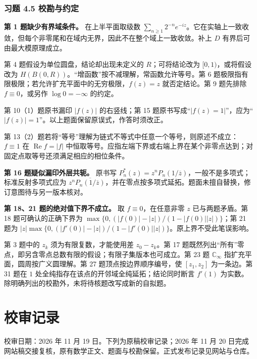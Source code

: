 \documentclass[11pt,a4paper]{article}
\begin{document}
\subsubsection{习题 4.5
校勘与约定}\label{ch04-practice-ux4e60ux9898-45-ux6821ux52d8ux4e0eux7ea6ux5b9a}

\textbf{第 1 题缺少有界域条件。} 在上半平面取级数
\(\sum_{n\ge1}2^{-n}e^{-iz}\)。它在实轴上一致收敛，但每个非零尾和在域内无界，因此不在整个域上一致收敛。补上
\(D\) 有界后可由最大模原理成立。

第 4 题假设为单位圆盘，结论却出现未定义的 \(R\)；可将结论改为
\([0,1)\)，或将假设改为
\(H(B(0,R))\)。``增函数''按不减理解，常函数允许等号。第 6
题极限指有限极限；若允许扩充平面中的无穷极限，\(f(z)=z\) 就否定结论。第
9 题先排除 \(f\equiv0\)，或另作 \(\log0=-\infty\) 的约定。

第 10（1）题原书漏印 \(|f(z)|\) 的右竖线；第 15
题原书写成``\(|f(z)=1|\)''，应为``\(|f(z)|=1\)''。以上题面保留原误式，作答时须改正。

第
13（2）题若将``等号''理解为链式不等式中任意一个等号，则原述不成立：\(f\equiv1\)
在 \(\operatorname{Re}f=|f|\)
中恒取等号。应指左端下界或右端上界在某个非零点达到；对固定点取等号还须满足相应的相位条件。

\textbf{第 16 题疑似漏印外层共轭。} 原书写
\(P_n^*(z)=z^nP_n(1/\overline z)\)，一般不是多项式；标准反射多项式应为
\(z^n\overline{P_n(1/\overline z)}\)，并在零点按多项式延拓。题面未擅自替换，修订意图待与另一版本核对。

\textbf{第 18、21 题的绝对值下界不成立。} 取 \(f\equiv0\)，在任意非零
\(z\) 已与两题矛盾。第 18 题可确认的正确下界为
\(\max\{0,(|f(0)|-|z|)/(1-|f(0)||z|)\}\)；第 21 题为
\(|z|\max\{0,(|f'(0)|-|z|)/(1-|f'(0)||z|)\}\)。原上界不受此笔误影响。

第 3 题中的 \(z_k\) 须为有限复数，才能使用差 \(z_0-z_k\)。第 17
题既然列出``所有''零点，即另含零点总数有限的假设；有限子集版本也可成立。第
23 题 \(\mathbb C_\infty\) 指扩充平面，圆周按广义圆理解。第 27
题顶点按边界顺序编号，使 \([z_1,z_2]\) 为一条边。第 31 题在 \(1\)
处全纯指存在该点的开邻域全纯延拓；结论同时断言 \(f'(1)\)
为实数。除明确列出的校勘外，未将待核题改写成新的自拟题。

\clearpage\section*{校审记录}
校审日期：2026 年 11 月 19
日。下列为原稿校审记录；2026 年 11 月 20 日完成网站稿交接复核，原有数学正文、题面与校勘保留。正式发布记录见网站与仓库。
\end{document}
